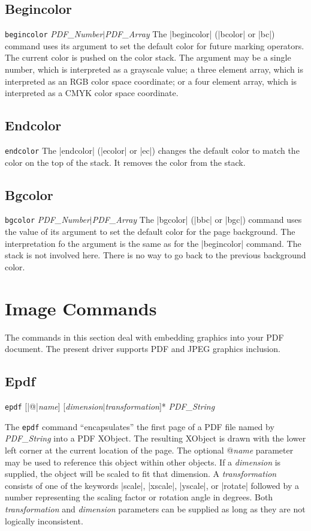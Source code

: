{\subsection{Begincolor}
\syntax
{\tt begincolor} {\it PDF\_Number$\vert$\it PDF\_Array}
\description
The |begincolor| (|bcolor| or |bc|) command uses its
argument to set the default color for future marking operators.
The current color is pushed on the color stack.  The argument
may be a single number, which is interpreted as a grayscale
value; a three element array, which is interpreted as an RGB
color space coordinate; or a four element array, which
is interpreted as a CMYK color space coordinate.
\example
\begintt
{}
\endtt

\subsection{Endcolor}
\syntax
{\tt endcolor}
\description
The |endcolor| (|ecolor| or |ec|)
changes the default color to
match the color on the top
of the stack.  It removes
the color from the stack.
\example
\begintt
{}
\endtt

\subsection{Bgcolor}
\syntax
{\tt bgcolor} {\it PDF\_Number$\vert$\it PDF\_Array}
\description
The |bgcolor| (|bbc| or |bgc|) command uses the value
of its argument to set the default color for the page
background.  The interpretation
fo the argument is the same as for the |begincolor| command.
The stack is not involved here.  There is no way
to go back to the previous background color.
\example
\begintt
{}
\endtt

\section{Image Commands}
The commands in this section deal with embedding
graphics into your PDF document.  The present
driver supports PDF and JPEG graphics inclusion.

\subsection{Epdf}
\syntax
{\tt epdf} [|@|{\it name}] [{\it dimension}$\vert${\it transformation}]*  {\it PDF\_String}

\description
The {\tt epdf} command ``encapsulates'' the first page of a PDF
file named by {\it PDF\_String}
into a PDF XObject.  The resulting XObject is drawn
with the lower left corner at the current location of the page.
The optional @{\it name} parameter may be used
to reference this object within other objects.  If a
{\it dimension} is supplied, the object will be scaled to fit
that dimension.  A {\it transformation} consists of one of the keywords
|scale|, |xscale|, |yscale|, or |rotate|
followed by a number representing
the scaling factor or rotation angle in degrees.  Both {\it transformation} and {\it dimension}
parameters can be supplied as long as they are not logically
inconsistent.
\example
\begintt
{}
\endtt

}
